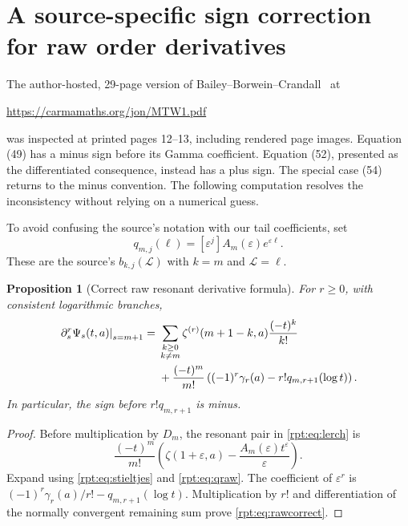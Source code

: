 \documentclass[11pt,a4paper]{article}
\numberwithin{equation}{section}
\newtheorem{proposition}[theorem]{Proposition}
\theoremstyle{definition}\newtheorem{definition}[theorem]{Definition}
\theoremstyle{remark}\newtheorem{remark}[theorem]{Remark}
\newcommand{\eps}{\varepsilon}
\newcommand{\coef}[2]{[#1^{#2}]}
\begin{document}
\section{A source-specific sign correction for raw order derivatives}
\label{rpt:sec:correction}

The author-hosted, 29-page version of Bailey--Borwein--Crandall~\cite{bbc} at
\begin{center}\url{https://carmamaths.org/jon/MTW1.pdf}\end{center}
was inspected at printed pages 12--13, including rendered page images. Equation (49) has a minus sign before its Gamma coefficient. Equation (52), presented as the differentiated consequence, instead has a plus sign. The special case (54) returns to the minus convention. The following computation resolves the inconsistency without relying on a numerical guess.

To avoid confusing the source's notation with our tail coefficients, set
\begin{equation}
q_{m,j}(\ell)=\coef{\eps}{j}A_m(\eps)e^{\eps\ell}.
\label{rpt:eq:qraw}
\end{equation}
These are the source's $b_{k,j}(\mathcal L)$ with $k=m$ and $\mathcal L=\ell$.

\begin{proposition}[Correct raw resonant derivative formula]
\label{rpt:prop:raw}
For $r\ge0$, with consistent logarithmic branches,
\begin{align}
\left.\partial_s^r\Psi_s(t,a)\right|_{s=m+1}
={}&\sum_{\substack{k\ge0\\k\ne m}}
\zeta^{(r)}(m+1-k,a)\frac{(-t)^k}{k!}
\notag\\
&+\frac{(-t)^m}{m!}
\left((-1)^r\gamma_r(a)-r!q_{m,r+1}(\log t)\right).
\label{rpt:eq:rawcorrect}
\end{align}
In particular, the sign before $r!q_{m,r+1}$ is minus.
\end{proposition}
\begin{proof}
Before multiplication by $D_m$, the resonant pair in \eqref{rpt:eq:lerch} is
\[
\frac{(-t)^m}{m!}
\left(\zeta(1+\eps,a)-\frac{A_m(\eps)t^\eps}{\eps}\right).
\]
Expand using \eqref{rpt:eq:stieltjes} and \eqref{rpt:eq:qraw}. The coefficient of $\eps^r$ is
$(-1)^r\gamma_r(a)/r!-q_{m,r+1}(\log t)$.
Multiplication by $r!$ and differentiation of the normally convergent remaining sum prove \eqref{rpt:eq:rawcorrect}.
\end{proof}
\end{document}
